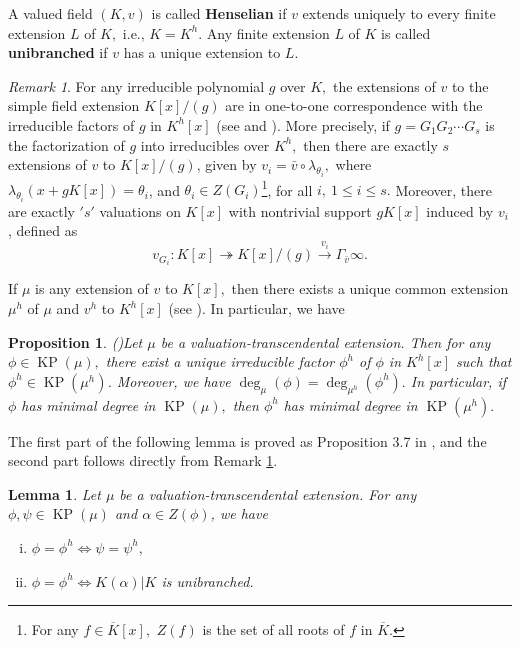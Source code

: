 \documentclass[11pt]{amsart}
\newtheorem{lemma}[theorem]{Lemma}
\newtheorem{proposition}[theorem]{Proposition}
\theoremstyle{definition}
\theoremstyle{remark}
\newtheorem{remark}[theorem]{Remark}
\numberwithin{equation}{section}
\begin{document}
A valued field $(K,v)$ is called {\bf Henselian} if $v$ extends uniquely to every finite extension $L$ of $K,$ i.e., $K=K^h.$ Any finite extension $L$ of $K$ is called {\bf unibranched} if $v$ has a unique extension to $L.$

	\begin{remark}\label{r21}
	For any irreducible polynomial $g$ over $K,$ the extensions of $v$ to the simple field extension $K[x]/(g)$ are in one-to-one correspondence with the irreducible factors of $g$ in $K^h[x]$ (see \cite[Section 17]{O} and \cite[Section 3]{EN3}). More precisely, if $g=G_1G_2\cdots G_s$ is the factorization of $g$ into irreducibles over $K^h,$ then there are exactly $s$ extensions of $v$ to $K[x]/(g)$, given by ${v}_i=\bar{v}\circ \lambda_{\theta_i},$ where $ \lambda_{\theta_i}(x+gK[x])=\theta_i$, and $\theta_i\in Z(G_i)$\footnote{For any $f\in \overline{K}[x],$ $Z(f)$ is the set of all roots of $f$ in $\overline{K}.$}, for all $i,\ 1\leq i \leq s.$
	Moreover, there are  exactly $'s'$ valuations on $K[x]$ with nontrivial support $gK[x]$ induced by ${v}_i$, defined as 
	\[v_{G_i}:K[x]\twoheadrightarrow K[x]/(g)\xrightarrow{{v}_i} \Gamma_{\bar{v}}\infty.\]
\end{remark}

If $\mu$ is any extension of $v$ to $K[x],$ then there exists a unique common extension $\mu^h$ of $\mu$ and $v^h$ to $K^h[x]$ (see \cite[Theorem A]{EN5}). In particular, we have 

\begin{proposition}(\cite[Proposition 5.6]{EN3})\label{df1}
Let $\mu$ be a valuation-transcendental extension. Then for any $\phi\in\operatorname{KP}(\mu),$ there exist a unique irreducible factor $\phi^h$ of $\phi$ in $K^h[x]$ such that $\phi^h\in \operatorname{KP}(\mu^h)$.
Moreover, we have $\deg_\mu(\phi)=\deg_{\mu^h}(\phi^h).$ In particular, if $\phi$ has minimal degree in $\operatorname{KP}(\mu),$ then $\phi^h$ has minimal degree in $\operatorname{KP}(\mu^h).$
\end{proposition}

The first part of the following lemma is proved as Proposition 3.7 in \cite{NA}, and the second part follows directly from Remark \ref{r21}.
\begin{lemma}\label{l1}
	Let $\mu$ be a valuation-transcendental extension. For any $\phi , \psi\in \operatorname{KP}(\mu)$ and $\alpha\in Z(\phi)$, we have
	\begin{enumerate}[(i)]
		\item $\phi=\phi^h \iff \psi=\psi^h,$
		\item $\phi=\phi^h \iff K(\alpha)|K $ is unibranched.
	\end{enumerate} 
\end{lemma}
\end{document}
